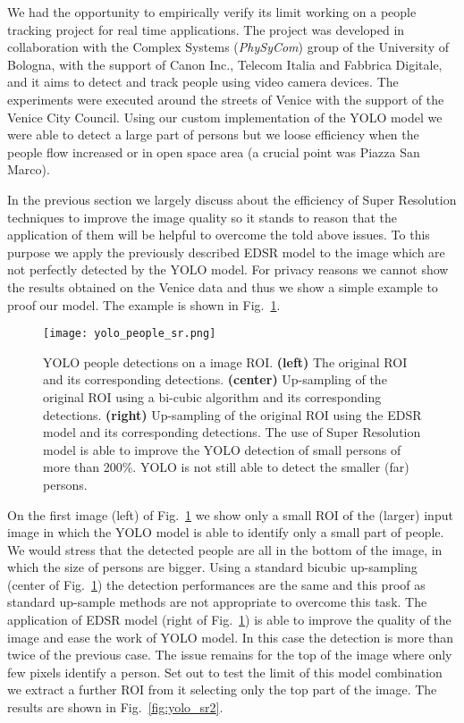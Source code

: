 \documentclass{standalone}
\begin{document}
We had the opportunity to empirically verify its limit working on a people tracking project for real time applications.
The project was developed in collaboration with the Complex Systems (\emph{PhySyCom}) group of the University of Bologna, with the support of Canon Inc., Telecom Italia and Fabbrica Digitale, and it aims to detect and track people using video camera devices.
The experiments were executed around the streets of Venice with the support of the Venice City Council.
Using our custom implementation of the YOLO model we were able to detect a large part of persons but we loose efficiency when the people flow increased or in open space area (a crucial point was Piazza San Marco).

In the previous section we largely discuss about the efficiency of Super Resolution techniques to improve the image quality so it stands to reason that the application of them will be helpful to overcome the told above issues.
To this purpose we apply the previously described EDSR model to the image which are not perfectly detected by the YOLO model.
For privacy reasons we cannot show the results obtained on the Venice data and thus we show a simple example to proof our model.
The example is shown in Fig.~\ref{fig:yolo_sr}.

\begin{figure}[htbp]
\centering
\texttt{[image: yolo\_people\_sr.png]}
\caption{YOLO people detections on a image ROI.
\textbf{(left)} The original ROI and its corresponding detections.
\textbf{(center)} Up-sampling of the original ROI using a bi-cubic algorithm and its corresponding detections.
\textbf{(right)} Up-sampling of the original ROI using the EDSR model and its corresponding detections.
The use of Super Resolution model is able to improve the YOLO detection of small persons of more than 200\%.
YOLO is not still able to detect the smaller (far) persons.
}
\label{fig:yolo_sr}
\end{figure}

On the first image (left) of Fig.~\ref{fig:yolo_sr} we show only a small ROI of the (larger) input image in which the YOLO model is able to identify only a small part of people.
We would stress that the detected people are all in the bottom of the image, in which the size of persons are bigger.
Using a standard bicubic up-sampling (center of Fig.~\ref{fig:yolo_sr}) the detection performances are the same and this proof as standard up-sample methods are not appropriate to overcome this task.
The application of EDSR model (right of Fig.~\ref{fig:yolo_sr}) is able to improve the quality of the image and ease the work of YOLO model.
In this case the detection is more than twice of the previous case.
The issue remains for the top of the image where only few pixels identify a person.
Set out to test the limit of this model combination we extract a further ROI from it selecting only the top part of the image.
The results are shown in Fig.~\ref{fig:yolo_sr2}.
\end{document}
